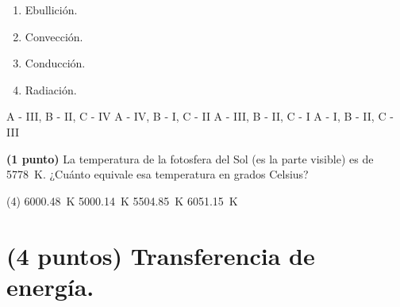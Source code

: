 \documentclass[12pt, letter]{exam}
\begin{document}
\begin{questions}
\begin{figure}[H]
    \end{figure}
    \begin{multicols}{4}
    \begin{enumerate}[label=\Roman*)]
        \item Ebullición.
        \item Convección.
        \item Conducción.
        \item Radiación.
    \end{enumerate}
    \end{multicols}
    \begin{tasks}
        \task A - III, B - II, C - IV
        \task A - IV, B - I, C - II
        \task A - III, B - II, C - I
        \task A - I, B - II, C - III
    \end{tasks}
    \question \textbf{(1 punto)} La temperatura de la fotosfera del Sol (es la parte visible) es de \SI{5778}{\kelvin}. ¿Cuánto equivale esa temperatura en grados Celsius?
    \begin{tasks}(4)
        \task \SI{6000.48}{\kelvin}
        \task \SI{5000.14}{\kelvin}
        \task \SI{5504.85}{\kelvin}
        \task \SI{6051.15}{\kelvin}
    \end{tasks}
   
    \section{(4 puntos) Transferencia de energía.}


\end{questions}
\end{document}
